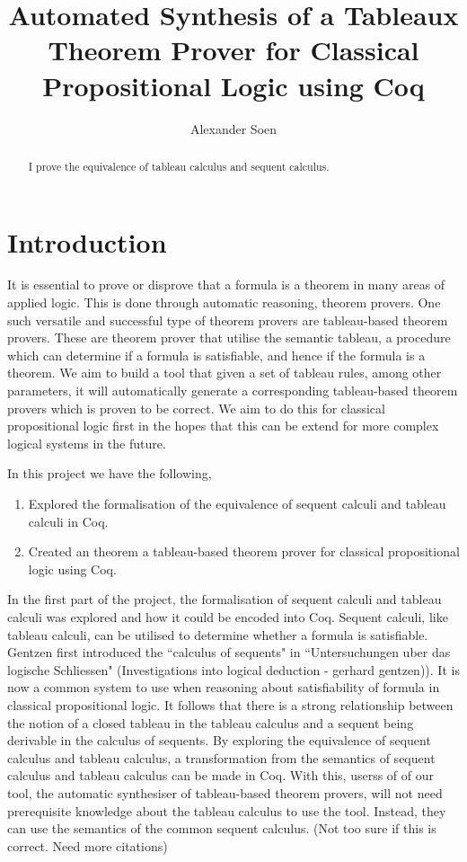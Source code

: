 \documentclass{report}
\title{Automated Synthesis of a Tableaux Theorem Prover for Classical
Propositional Logic using Coq}
\author{Alexander Soen}
\theoremstyle{definition}
\begin{document}
\begin{abstract}
I prove the equivalence of tableau calculus and sequent calculus.
\end{abstract}

\section{Introduction}

It is essential to prove or disprove that a formula is a theorem in many areas
of applied logic. This is done through automatic reasoning, theorem provers.
One such versatile and successful type of theorem provers are tableau-based
theorem provers. These are theorem prover that utilise the semantic tableau, a
procedure which can determine if a formula is satisfiable, and hence if the
formula is a theorem. We aim to build a tool that given a set of tableau rules,
among other parameters, it will automatically generate a corresponding
tableau-based theorem provers which is proven to be correct. We aim to do this
for classical propositional logic first in the hopes that this can be extend
for more complex logical systems in the future.

In this project we have the following,

\begin{enumerate}
\item Explored the formalisation of the equivalence of sequent calculi and 
tableau calculi in Coq.
\item Created an theorem a tableau-based theorem prover for classical
propositional logic using Coq.
\end{enumerate}

In the first part of the project, the formalisation of sequent calculi and
tableau calculi was explored and how it could be encoded into Coq. Sequent
calculi, like tableau calculi, can be utilised to determine whether a formula
is satisfiable. Gentzen first introduced the ``calculus of sequents" in
``Untersuchungen uber das logische Schliessen" (Investigations into logical
deduction - gerhard gentzen)). It is now a common system to use when reasoning
about satisfiability of formula in classical propositional logic. It follows
that there is a strong relationship between the notion of a closed tableau in
the tableau calculus and a sequent being derivable in the calculus of sequents.
By exploring the equivalence of sequent calculus and tableau calculus, a
transformation from the semantics of sequent calculus and tableau calculus can
be made in Coq. With this, userss of of our tool, the automatic synthesiser of
tableau-based theorem provers, will not need prerequisite knowledge about the
tableau calculus to use the tool. Instead, they can use the semantics of the
common sequent calculus.
(Not too sure if this is correct. Need more citations)
\end{document}
